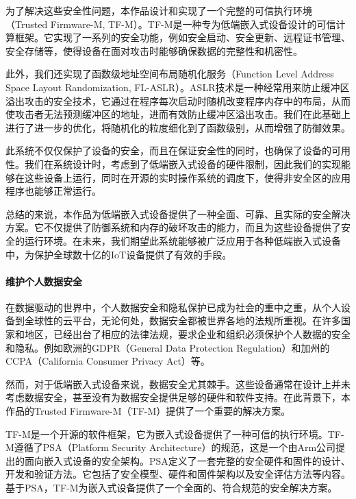 \documentclass[UTF8,12pt,a4paper,twoside]{ctexart}
\numberwithin{figure}{section}
\begin{document}
\par 为了解决这些安全性问题，本作品设计和实现了一个完整的可信执行环境（Trusted Firmware-M, TF-M）。TF-M是一种专为低端嵌入式设备设计的可信计算框架。它实现了一系列的安全功能，例如安全启动、安全更新、远程证书管理、安全存储等，使得设备在面对攻击时能够确保数据的完整性和机密性。

\par 此外，我们还实现了函数级地址空间布局随机化服务（Function Level Address Space Layout Randomization, FL-ASLR）。ASLR技术是一种经常用来防止缓冲区溢出攻击的安全技术，它通过在程序每次启动时随机改变程序内存中的布局，从而使攻击者无法预测缓冲区的地址，进而有效防止缓冲区溢出攻击。我们在此基础上进行了进一步的优化，将随机化的粒度细化到了函数级别，从而增强了防御效果。

\par 此系统不仅仅保护了设备的安全，而且在保证安全性的同时，也确保了设备的可用性。我们在系统设计时，考虑到了低端嵌入式设备的硬件限制，因此我们的实现能够在这些设备上运行，同时在开源的实时操作系统的调度下，使得非安全区的应用程序也能够正常运行。

\par 总结的来说，本作品为低端嵌入式设备提供了一种全面、可靠、且实际的安全解决方案。它不仅提供了防御系统和内存的破坏攻击的能力，而且为这些设备提供了安全的运行环境。在未来，我们期望此系统能够被广泛应用于各种低端嵌入式设备中，为保护全球数十亿的IoT设备提供了有效的手段。
\paragraph{维护个人数据安全}
\par 在数据驱动的世界中，个人数据安全和隐私保护已成为社会的重中之重，从个人设备到全球性的云平台，无论何处，数据安全都被世界各地的法规所重视。在许多国家和地区，已经出台了相应的法律法规，要求企业和组织必须保护个人数据的安全和隐私。例如欧洲的GDPR（General Data Protection Regulation）和加州的CCPA（California Consumer Privacy Act）等。

\par 然而，对于低端嵌入式设备来说，数据安全尤其棘手。这些设备通常在设计上并未考虑数据安全，甚至没有为数据安全提供足够的硬件和软件支持。在此背景下，本作品的Trusted Firmware-M（TF-M）提供了一个重要的解决方案。

\par TF-M是一个开源的软件框架，它为嵌入式设备提供了一种可信的执行环境。TF-M遵循了PSA（Platform Security Architecture）的规范，这是一个由Arm公司提出的面向嵌入式设备的安全架构。PSA定义了一套完整的安全硬件和固件的设计、开发和验证方法。它包括了安全模型、硬件和固件架构以及安全评估方法等内容。基于PSA，TF-M为嵌入式设备提供了一个全面的、符合规范的安全解决方案。
\end{document}
